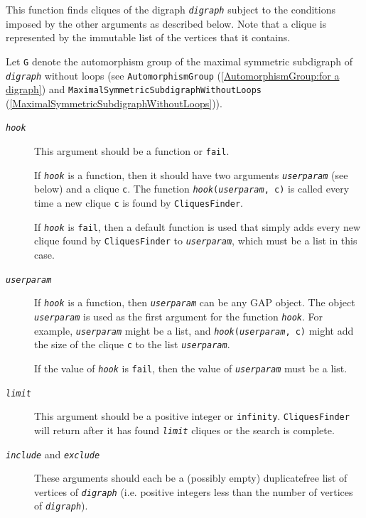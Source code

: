 \documentclass[a4paper,11pt]{report}
\begin{document}
{{{ This function finds cliques of the digraph \mbox{\texttt{\mdseries\slshape digraph}} subject to the conditions imposed by the other arguments as described below.
Note that a clique is represented by the immutable list of the vertices that
it contains. 

 Let \texttt{G} denote the automorphism group of the maximal symmetric subdigraph of \mbox{\texttt{\mdseries\slshape digraph}} without loops (see \texttt{AutomorphismGroup} (\ref{AutomorphismGroup:for a digraph}) and \texttt{MaximalSymmetricSubdigraphWithoutLoops} (\ref{MaximalSymmetricSubdigraphWithoutLoops})). 
\begin{description}
\item[{\mbox{\texttt{\mdseries\slshape hook}}}]  This argument should be a function or \texttt{fail}.

 If \mbox{\texttt{\mdseries\slshape hook}} is a function, then it should have two arguments \mbox{\texttt{\mdseries\slshape user{\textunderscore}param}} (see below) and a clique \texttt{c}. The function \texttt{\mbox{\texttt{\mdseries\slshape hook}}(\mbox{\texttt{\mdseries\slshape user{\textunderscore}param}}, c)} is called every time a new clique \texttt{c} is found by \texttt{CliquesFinder}.

 If \mbox{\texttt{\mdseries\slshape hook}} is \texttt{fail}, then a default function is used that simply adds every new clique found by \texttt{CliquesFinder} to \mbox{\texttt{\mdseries\slshape user{\textunderscore}param}}, which must be a list in this case. 
\item[{\mbox{\texttt{\mdseries\slshape user{\textunderscore}param}}}]  If \mbox{\texttt{\mdseries\slshape hook}} is a function, then \mbox{\texttt{\mdseries\slshape user{\textunderscore}param}} can be any \textsf{GAP} object. The object \mbox{\texttt{\mdseries\slshape user{\textunderscore}param}} is used as the first argument for the function \mbox{\texttt{\mdseries\slshape hook}}. For example, \mbox{\texttt{\mdseries\slshape user{\textunderscore}param}} might be a list, and \texttt{\mbox{\texttt{\mdseries\slshape hook}}(\mbox{\texttt{\mdseries\slshape user{\textunderscore}param}}, c)} might add the size of the clique \texttt{c} to the list \mbox{\texttt{\mdseries\slshape user{\textunderscore}param}}. 

 If the value of \mbox{\texttt{\mdseries\slshape hook}} is \texttt{fail}, then the value of \mbox{\texttt{\mdseries\slshape user{\textunderscore}param}} must be a list. 
\item[{\mbox{\texttt{\mdseries\slshape limit}}}]  This argument should be a positive integer or \texttt{infinity}. \texttt{CliquesFinder} will return after it has found \mbox{\texttt{\mdseries\slshape limit}} cliques or the search is complete. 
\item[{\mbox{\texttt{\mdseries\slshape include}} and \mbox{\texttt{\mdseries\slshape exclude}}}]  These arguments should each be a (possibly empty)
duplicate\texttt{}free list of vertices of \mbox{\texttt{\mdseries\slshape digraph}} (i.e. positive integers less than the number of vertices of \mbox{\texttt{\mdseries\slshape digraph}}). 


\end{description}}}}
\end{document}
